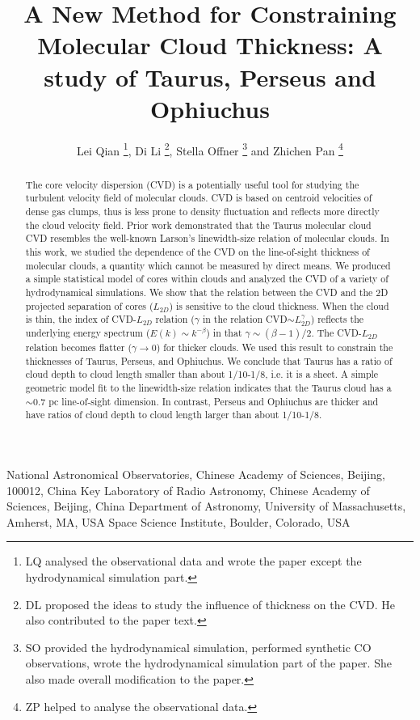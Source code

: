 \documentclass[iop,revtex4]{emulateapj}
\begin{document}
\slugcomment{}

 


\title{A New Method for Constraining Molecular Cloud Thickness: A study of Taurus, Perseus and Ophiuchus}



\author{ Lei Qian \footnote{LQ analysed the observational data and wrote the paper except the hydrodynamical simulation part.}, Di Li   \footnote{DL proposed the ideas to study the influence of thickness on the CVD. He also contributed to the paper text.}, Stella Offner \footnote{SO provided the hydrodynamical simulation, performed synthetic CO observations, wrote the hydrodynamical simulation part of the paper. She also made overall modification to the paper.} and Zhichen Pan \footnote{ZP helped to analyse the observational data.}}
\affil{}  {National Astronomical Observatories,
Chinese Academy of Sciences, Beijing, 100012, China}
 {Key Laboratory of Radio Astronomy, Chinese Academy of Sciences, Beijing, China}
 {Department of Astronomy, University of Massachusetts, Amherst, MA, USA}
 {Space Science Institute, Boulder, Colorado, USA}


\begin{abstract}
The core velocity dispersion (CVD) is a potentially useful tool for studying the turbulent velocity field of molecular clouds. CVD is based on centroid velocities of dense gas clumps, thus is less prone to density fluctuation and reflects more directly the cloud velocity field. Prior work demonstrated that the Taurus molecular cloud CVD resembles the well-known Larson's linewidth-size relation of molecular clouds. In this work, we studied the dependence of the CVD on the line-of-sight thickness of molecular clouds, a quantity which cannot be measured by direct means. We produced a simple statistical model of cores within clouds and analyzed the CVD of a variety of hydrodynamical simulations. We show that the relation between the CVD and the 2D projected separation of cores ($L_{2D}$) is sensitive to the cloud thickness. When the cloud is thin, the index of  CVD-$L_{2D}$ relation ($\gamma$ in the relation CVD$\sim L_{2D}^{\gamma}$) reflects the underlying energy spectrum ($E(k)\sim k^{-\beta}$) in that $\gamma\sim(\beta-1)/2$. The CVD-$L_{2D}$ relation becomes flatter ($\gamma\to 0$) for thicker clouds. We used this result to constrain the thicknesses of Taurus, Perseus, and Ophiuchus. We conclude that Taurus has a ratio of cloud depth to cloud length smaller than about 1/10-1/8, i.e. it is a sheet. A simple geometric model fit to the linewidth-size relation indicates that the Taurus cloud has a $\sim 0.7$ pc line-of-sight dimension. In contrast, Perseus and Ophiuchus  are thicker and have ratios of cloud depth to cloud length larger than about 1/10-1/8.
\end{abstract}
\end{document}
